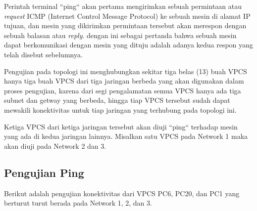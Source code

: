 \documentclass[12pt, a4paper]{article}
\begin{document}
  Perintah terminal ``ping`` akan pertama mengirimkan sebuah permintaan atau
  \emph{request} ICMP (Internet Control Message Protocol) ke sebuah mesin di
  alamat IP tujuan, dan mesin yang dikirimkan permintaan tersebut akan merespon
  dengan sebuah balasan atau \emph{reply}. dengan ini sebagai pertanda bahwa
  sebuah mesin dapat berkomunikasi dengan mesin yang dituju adalah adanya 
  kedua respon yang telah disebut sebelumnya.

  Pengujian pada topologi ini menghubungkan sekitar tiga belas (13) buah
  VPCS hanya tiga buah VPCS dari tiga jaringan berbeda yang akan digunakan
  dalam proses pengujian, karena dari segi pengalamatan semua VPCS hanya
  ada tiga subnet dan getway yang berbeda, hingga tiap VPCS tersebut
  sudah dapat mewakili konektivitas untuk tiap jaringan yang terhubung
  pada topologi ini.

  Ketiga VPCS dari ketiga jaringan tersebut akan diuji ``ping`` terhadap
  mesin yang ada di kedua jaringan lainnya. Misalkan satu VPCS pada 
  Network 1 maka akan diuji pada Network 2 dan 3.

  \newpage

  \subsection{Pengujian Ping}

  Berikut adalah pengujian konektivitas dari VPCS PC6, PC20, dan PC1 yang
  berturut turut berada pada Network 1, 2, dan 3.
\end{document}

